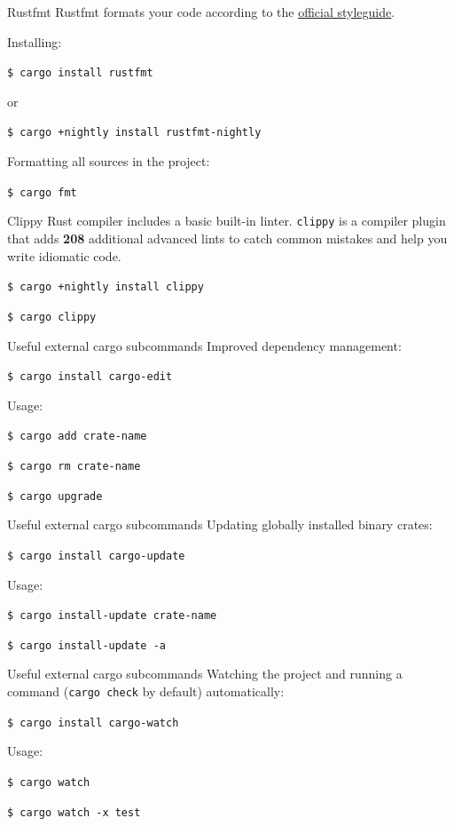 \documentclass[12pt, aspectratio=169]{beamer}
\begin{document}
\begin{frame}{Rustfmt}
  Rustfmt formats your code according to the
  \href{https://github.com/rust-lang-nursery/fmt-rfcs}{official styleguide}.

  Installing:

  \texttt{\$ cargo install rustfmt}

  or

  \texttt{\$ cargo +nightly install rustfmt-nightly}

  Formatting all sources in the project:

  \texttt{\$ cargo fmt}
\end{frame}

\begin{frame}{Clippy}
  Rust compiler includes a basic built-in linter. \texttt{clippy} is a compiler
  plugin that adds \textbf{208} additional advanced lints to catch common
  mistakes and help you write idiomatic code.

  \texttt{\$ cargo +nightly install clippy}

  \texttt{\$ cargo clippy}
\end{frame}

\begin{frame}{Useful external cargo subcommands}
  Improved dependency management:

  \texttt{\$ cargo install cargo-edit}

  Usage:

  \texttt{\$ cargo add crate-name}

  \texttt{\$ cargo rm crate-name}

  \texttt{\$ cargo upgrade}
\end{frame}

\begin{frame}{Useful external cargo subcommands}
  Updating globally installed binary crates:

  \texttt{\$ cargo install cargo-update}

  Usage:

  \texttt{\$ cargo install-update crate-name}

  \texttt{\$ cargo install-update -a}
\end{frame}

\begin{frame}{Useful external cargo subcommands}
  Watching the project and running a command (\texttt{cargo check} by default)
  automatically:

  \texttt{\$ cargo install cargo-watch}

  Usage:

  \texttt{\$ cargo watch}

  \texttt{\$ cargo watch -x test}
\end{frame}
\end{document}
